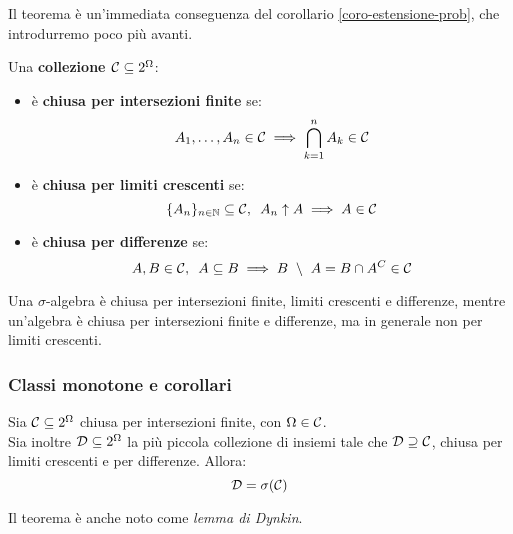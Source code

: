 Il teorema è un'immediata conseguenza del corollario \ref{coro-estensione-prob}, che introdurremo poco più avanti.

\medskip
\begin{defn}
  Una \textbf{collezione $\mathcal C \subseteq 2^\Omega$}:
  \begin{itemize}
    \item  è \textbf{chiusa per intersezioni finite} se: 
      $$A_1, \dots, A_n \in \mathcal C \implies \bigcap\limits_{k=1}^{n} A_k \in \mathcal C$$
    \item è \textbf{chiusa per limiti crescenti} se: 
      $$\{A_n\}_{n \in \mathbb N} \subseteq \mathcal C, \enspace A_n \uparrow A \implies A \in \mathcal C$$
    \item è \textbf{chiusa per differenze} se: 
      $$ A,B \in \Cc, \enspace A \subseteq B \implies B \ \setminus \ A = B \cap A^C \in \Cc$$
  \end{itemize}
\end{defn}

\medskip
\begin{nb}
  Una $\sigma$-algebra è chiusa per intersezioni finite, limiti crescenti e differenze, mentre un'algebra è chiusa per intersezioni finite e differenze, ma in generale non per limiti crescenti.
\end{nb}

\subsubsection{Classi monotone e corollari}
\begin{teo}\label{teo-classi-monotone}
  Sia $\mathcal C \subseteq 2^\Omega$ chiusa per intersezioni finite, con $\Omega \in \mathcal C$. \\
  Sia inoltre $\mathcal D \subseteq 2^\Omega$ la più piccola collezione di insiemi tale che $\mathcal D \supseteq \mathcal C$, chiusa per limiti crescenti e per differenze. Allora:
  $$\mathcal D = \sigma(\mathcal C)$$
\end{teo}
Il teorema è anche noto come \emph{lemma di Dynkin}.

